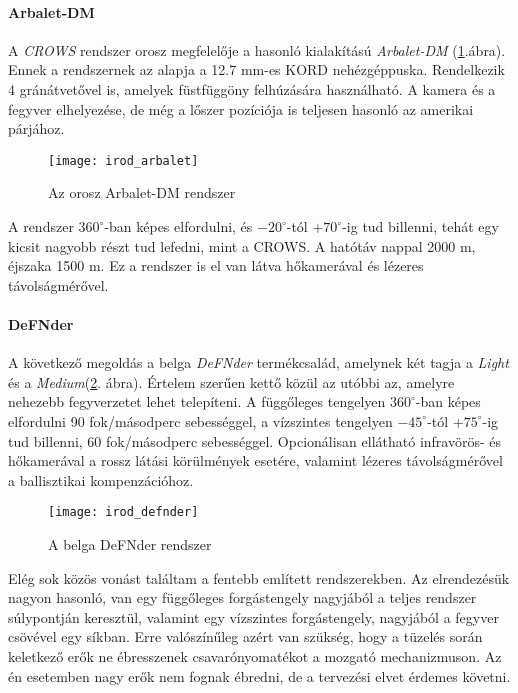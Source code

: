 \paragraph{Arbalet-DM \cite{arbalet}}
A \textsl{CROWS} rendszer orosz megfelelője a hasonló kialakítású \textsl{Arbalet-DM} (\ref{fig:irod_arbalet}.ábra). Ennek a rendszernek az alapja a 12.7 mm-es KORD nehézgéppuska. Rendelkezik 4 gránátvetővel is, amelyek füstfüggöny felhúzására használható. A kamera és a fegyver elhelyezése, de még a lőszer pozíciója is teljesen hasonló az amerikai párjához.

\begin{figure}[h!]
	\centering
	\texttt{[image: irod\_arbalet]}
	\caption{Az orosz Arbalet-DM rendszer \cite{arbalet}}
	\label{fig:irod_arbalet}
\end{figure}

A rendszer $360^\circ$-ban képes elfordulni, és $-20^{\circ}$-tól $+70^{\circ}$-ig tud billenni, tehát egy kicsit nagyobb részt tud lefedni, mint a CROWS. A hatótáv nappal 2000 m, éjszaka 1500 m. Ez a rendszer is el van látva hőkamerával és lézeres távolságmérővel.

\paragraph{DeFNder \cite{defnder}}
A következő megoldás a belga \textsl{DeFNder} termékcsalád, amelynek két tagja a \textsl{Light} és a \textsl{Medium}(\ref{fig:irod_defnder}. ábra). Értelem szerűen kettő közül az utóbbi az, amelyre nehezebb fegyverzetet lehet telepíteni. A függőleges tengelyen $360^\circ$-ban képes elfordulni 90 fok/másodperc sebességgel, a vízszintes tengelyen $-45^{\circ}$-tól $+75^{\circ}$-ig tud billenni, 60 fok/másodperc sebességgel. Opcionálisan ellátható infravörös- és hőkamerával a rossz látási körülmények esetére, valamint lézeres távolságmérővel a ballisztikai kompenzációhoz.
\begin{figure}[h!]
	\centering
	\texttt{[image: irod\_defnder]}
	\caption{A belga DeFNder rendszer \cite{defnder}}
	\label{fig:irod_defnder}
\end{figure}

Elég sok közös vonást találtam a fentebb említett rendszerekben. Az elrendezésük nagyon hasonló, van egy függőleges forgástengely nagyjából a teljes rendszer súlypontján keresztül, valamint egy vízszintes forgástengely, nagyjából a fegyver csövével egy síkban. Erre valószínűleg azért van szükség, hogy a tüzelés során keletkező erők ne ébresszenek csavarónyomatékot a mozgató mechanizmuson. Az én esetemben nagy erők nem fognak ébredni, de a tervezési elvet érdemes követni.

